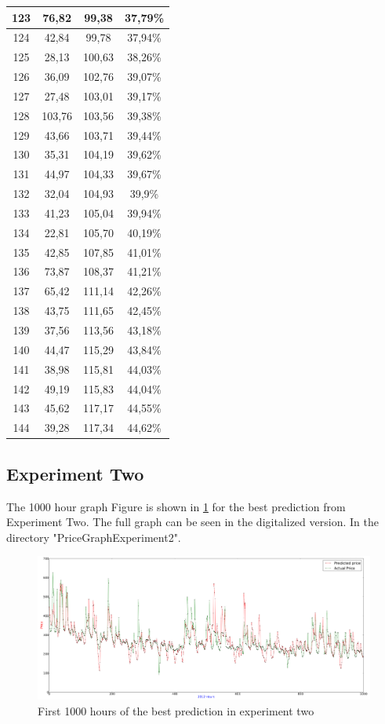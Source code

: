 \begin{longtable}{|c|c|c|c|}
	123 & 76,82 & 99,38 & 37,79\% \\ \hline
	124 & 42,84 & 99,78 & 37,94\% \\ \hline
	125 & 28,13 & 100,63 & 38,26\% \\ \hline
	126 & 36,09 & 102,76 & 39,07\% \\ \hline
	127 & 27,48 & 103,01 & 39,17\% \\ \hline
	128 & 103,76 & 103,56 & 39,38\% \\ \hline
	129 & 43,66 & 103,71 & 39,44\% \\ \hline
	130 & 35,31 & 104,19 & 39,62\% \\ \hline
	131 & 44,97 & 104,33 & 39,67\% \\ \hline
	132 & 32,04 & 104,93 & 39,9\% \\ \hline
	133 & 41,23 & 105,04 & 39,94\% \\ \hline
	134 & 22,81 & 105,70 & 40,19\% \\ \hline
	135 & 42,85 & 107,85 & 41,01\% \\ \hline
	136 & 73,87 & 108,37 & 41,21\% \\ \hline
	137 & 65,42 & 111,14 & 42,26\% \\ \hline
	138 & 43,75 & 111,65 & 42,45\% \\ \hline
	139 & 37,56 & 113,56 & 43,18\% \\ \hline
	140 & 44,47 & 115,29 & 43,84\% \\ \hline
	141 & 38,98 & 115,81 & 44,03\% \\ \hline
	142 & 49,19 & 115,83 & 44,04\% \\ \hline
	143 & 45,62 & 117,17 & 44,55\% \\ \hline
	144 & 39,28 & 117,34 & 44,62\% \\ \hline
	\end{longtable}
\normalsize

\subsection{Experiment Two}
The 1000 hour graph Figure is shown in \ref{fig:fullPageExperiment2} for the best prediction from Experiment Two. The full graph can be seen in the digitalized version. In the directory "PriceGraphExperiment2".

\begin{figure}
\centering
\includegraphics[width=\linewidth]{billeder/PriceGraphs/Experiment2.png}
\caption{First 1000 hours of the best prediction in experiment two}
\label{fig:fullPageExperiment2}
\end{figure}


